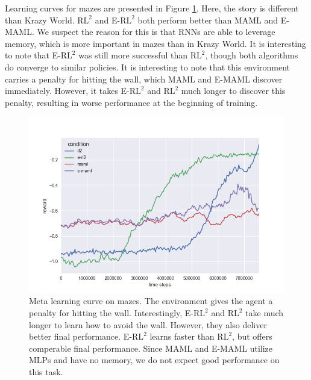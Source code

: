 \documentclass{article} %
\begin{document}
Learning curves for mazes are presented in Figure \ref{fig:learning-curves-1}. Here, the story is different than Krazy World. $\text{RL}^2$ and E-$\text{RL}^2$ both perform better than MAML and E-MAML. We suspect the reason for this is that RNNs are able to leverage memory, which is more important in mazes than in Krazy World. It is interesting to note that  E-$\text{RL}^2$ was still more successful than  $\text{RL}^2$, though both algorithms do converge to similar policies. It is interesting to note that this environment carries a penalty for hitting the wall, which MAML and E-MAML discover immediately. However, it takes E-$\text{RL}^2$ and $\text{RL}^2$ much longer to discover this penalty, resulting in worse performance at the beginning of training. 
\begin{figure}[h]
\begin{center}
\includegraphics[scale=0.4]{bradly_curves/64_maze_curves.png}
\end{center}
\caption{Meta learning curve on mazes. The environment gives the agent a penalty for hitting the wall. Interestingly, E-$\text{RL}^2$ and $\text{RL}^2$ take much longer to learn how to avoid the wall. However, they also deliver better final performance. E-$\text{RL}^2$ learns faster than $\text{RL}^2$, but offers comperable final performance. Since MAML and E-MAML utilize MLPs and have no memory, we do not expect good performance on this task.}
\label{fig:learning-curves-1}
\end{figure} 
\end{document}
